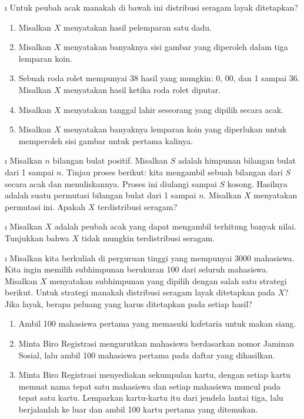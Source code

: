 \begin{LJSItem}

\i\label{exer 5.1.100} Untuk peubah acak manakah di bawah ini distribusi seragam
layak ditetapkan?
\begin{enumerate}
\item Misalkan $X$ menyatakan hasil pelemparan satu dadu.
\item Misalkan $X$ menyatakan banyaknya sisi gambar yang diperoleh dalam tiga lemparan koin.
\item Sebuah roda rolet mempunyai 38 hasil yang mungkin: 0, 00, dan 1 sampai 36.
Misalkan $X$ menyatakan hasil ketika roda rolet diputar.
\item Misalkan $X$ menyatakan tanggal lahir seseorang yang dipilih secara acak.
\item Misalkan $X$ menyatakan banyaknya lemparan koin yang diperlukan untuk memperoleh
sisi gambar untuk pertama kalinya. 
\end{enumerate}

\i\label{exer 5.1.101} Misalkan $n$ bilangan bulat positif. Misalkan $S$ adalah
himpunan bilangan bulat dari 1 sampai $n$. Tinjau proses berikut: kita mengambil
sebuah bilangan dari $S$ secara acak dan menuliskannya. Proses ini diulangi sampai
$S$ kosong. Hasilnya adalah suatu permutasi bilangan bulat dari 1 sampai $n$.
Misalkan $X$ menyatakan permutasi ini. Apakah $X$ terdistribusi seragam?

\i\label{exer 5.1.102} Misalkan $X$ adalah peubah acak yang dapat mengambil
terhitung banyak nilai. Tunjukkan bahwa $X$ tidak mungkin terdistribusi seragam.

\i\label{exer 5.1.103} Misalkan kita berkuliah di perguruan tinggi yang mempunyai
3000 mahasiswa. Kita ingin memilih subhimpunan berukuran 100 dari seluruh mahasiswa.
Misalkan $X$ menyatakan subhimpunan yang dipilih dengan salah satu strategi berikut.
Untuk strategi manakah distribusi seragam layak ditetapkan pada $X$? Jika layak,
berapa peluang yang harus ditetapkan pada setiap hasil?
\begin{enumerate}
\item Ambil 100 mahasiswa pertama yang memasuki kafetaria untuk makan siang.
\item Minta Biro Registrasi mengurutkan mahasiswa berdasarkan nomor Jaminan Sosial,
lalu ambil 100 mahasiswa pertama pada daftar yang dihasilkan.
\item Minta Biro Registrasi menyediakan sekumpulan kartu, dengan setiap kartu memuat
nama tepat satu mahasiswa dan setiap mahasiswa muncul pada tepat satu kartu. Lemparkan
kartu-kartu itu dari jendela lantai tiga, lalu berjalanlah ke luar dan ambil 100 kartu
pertama yang ditemukan.
\end{enumerate}


\end{LJSItem}
